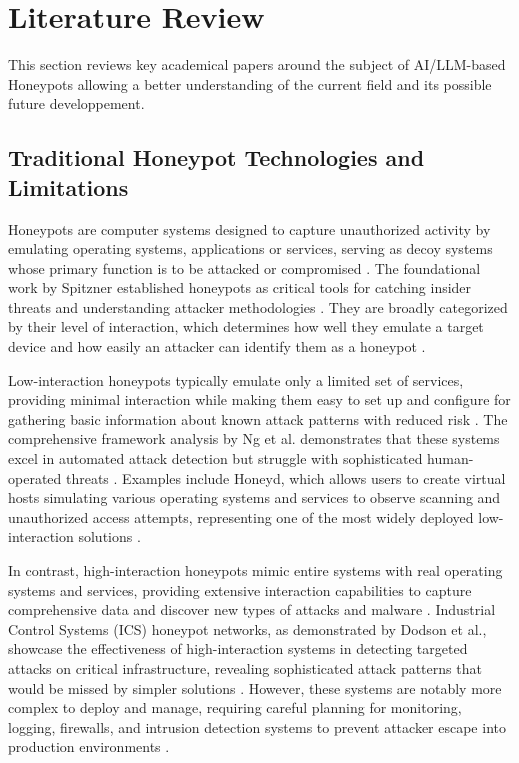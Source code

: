 \chapter{Literature Review}

This section reviews key academical papers around the subject of AI/LLM-based Honeypots allowing a better understanding of the current field and its possible future developpement.

\section{Traditional Honeypot Technologies and Limitations}

Honeypots are computer systems designed to capture unauthorized activity by emulating operating systems, applications or services, serving as decoy systems whose primary function is to be attacked or compromised \cite{spitzner2003}. The foundational work by Spitzner established honeypots as critical tools for catching insider threats and understanding attacker methodologies \cite{spitzner2003}. They are broadly categorized by their level of interaction, which determines how well they emulate a target device and how easily an attacker can identify them as a honeypot \cite{dodson2022}.

Low-interaction honeypots typically emulate only a limited set of services, providing minimal interaction while making them easy to set up and configure for gathering basic information about known attack patterns with reduced risk \cite{Ng2021}. The comprehensive framework analysis by Ng et al. demonstrates that these systems excel in automated attack detection but struggle with sophisticated human-operated threats \cite{Ng2021}. Examples include Honeyd, which allows users to create virtual hosts simulating various operating systems and services to observe scanning and unauthorized access attempts, representing one of the most widely deployed low-interaction solutions \cite{Ng2021}.

In contrast, high-interaction honeypots mimic entire systems with real operating systems and services, providing extensive interaction capabilities to capture comprehensive data and discover new types of attacks and malware \cite{Ng2021}. Industrial Control Systems (ICS) honeypot networks, as demonstrated by Dodson et al., showcase the effectiveness of high-interaction systems in detecting targeted attacks on critical infrastructure, revealing sophisticated attack patterns that would be missed by simpler solutions \cite{dodson2022}. However, these systems are notably more complex to deploy and manage, requiring careful planning for monitoring, logging, firewalls, and intrusion detection systems to prevent attacker escape into production environments \cite{dodson2022}.

